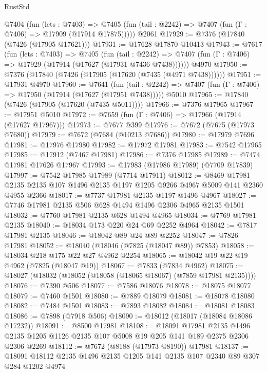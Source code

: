 \begin{lexlean}{RustStd}
\begin{coremodule}
    @7404
      (fun (lets : @7403) =>
      @7405 (fun (tail : @2242) => @7407 (fun (Γ : @7406) => @17909 (@17914 @17875)))))
    @2061
@17929 := @7376 (@17840 (@7426 (@17905 @17621)))
@17931 := @17628 @17870 @10413
@17943 := @7617
    (fun (lets : @7403) =>
    @7405
      (fun (tail : @2242) =>
      @7407 (fun (Γ : @7406) => @17929 (@17914 (@17627 (@17931 @7436 @7438))))))
    @4970
@17950 := @7376 (@17840 (@7426 (@17905 (@17620 (@7435 (@4971 @7438))))))
@17951 := @17931 @4970
@17960 := @7641
    (fun (tail : @2242) => @7407 (fun (Γ : @7406) => @17950 (@17914 (@17627 (@17951 @7438)))))
    @5010
@17965 := @17840 (@7426 (@17905 (@17620 (@7435 @5011))))
@17966 := @7376 @17965
@17967 := @17951 @5010
@17972 := @7659 (fun (Γ : @7406) => @17966 (@17914 (@17627 @17967)))
@17973 := @7677 @399
@17976 := @7672 (@7675 (@17973 @7680))
@17979 := @7672 (@7684 (@10213 @7686))
@17980 := @17979 @7696
@17981 := @17976 @17980
@17982 := @17972 @17981
@17983 := @7542 @17965
@17985 := @17912 (@7467 @17981)
@17986 := @7376 @17985
@17989 := @7474 @17981 @17626 @17967
@17993 := @17983 (@17986 @17989) (@7709 @17839)
@17997 := @7542 @17985 @17989 (@7714 @17911)
@18012 := @8469
    @17981
    @2135
    @2135
    @107
    @1496
    @2135
    @1197
    @1205
    @9266
    @4967
    @5009
    @141
    @2360
    @4955
    @2366
@18017 := @7737 @17981 @2135 @1197 @1496 @4967
@18027 := @7746 @17981 @2135 @506 @628 @1494 @1496 @2306 @4965 @2135 @1501
@18032 := @7760 @17981 @2135 @628 @1494 @4965
@18034 := @7769 @17981 @2135
@18040 := @18034 @173 @220 @24 @69 @2252 @4964
@18042 := @7817 @17981 @2135
@18046 := @18042 @89 @24 @89 @2252
@18047 := @7826 @17981
@18052 := @18040 (@18046 (@7825 (@18047 @89)) @7853)
@18058 := @18034 @218 @175 @22 @27 @4962 @2254
@18065 := @18042 @19 @22 @19 @4962 (@7825 (@18047 @19))
@18067 := @7833 (@7834 @4962)
@18075 := @18027 (@18032 (@18052 (@18058 (@18065 @18067) (@7859 @17981 @2135))))
@18076 := @7390 @506
@18077 := @7586 @18076
@18078 := @18075 @18077
@18079 := @7460 @1501
@18080 := @7889 @18079
@18081 := @18078 @18080
@18082 := @7484 @1501
@18083 := @7893 @18082
@18084 := @18081 @18083
@18086 := @7898 (@7918 @506)
@18090 := @18012 (@18017 (@18084 @18086 @17232))
@18091 := @8500 @17981
@18108 := @18091
    @17981
    @2135
    @1496
    @2135
    @1205
    @1126
    @2135
    @107
    @5008
    @19
    @205
    @141
    @189
    @2375
    @2306
    @2306
    @2269
@18112 := @7672 (@8188 (@17973 @8190)) @17981
@18137 := @18091
    @18112
    @2135
    @1496
    @2135
    @1205
    @141
    @2135
    @107
    @2340
    @89
    @307
    @284
    @1202
    @4974

\end{coremodule}
\end{lexlean}

